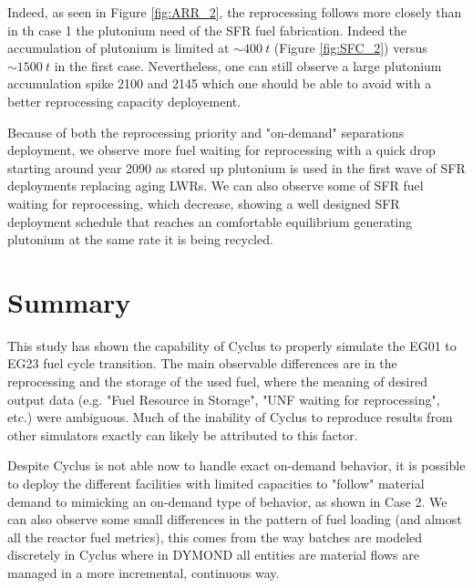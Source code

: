 \documentclass[12pt]{article}
\begin{document}
Indeed, as seen in Figure \ref{fig:ARR_2}, the reprocessing follows more closely
than in th case 1 the plutonium need of the SFR fuel fabrication. Indeed the
accumulation of plutonium is limited at $\sim400~t$ (Figure \ref{fig:SFC_2}) versus $\sim1500~t$ in the
first case. Nevertheless, one can still observe a large plutonium accumulation
spike 2100 and 2145 which one should be able to avoid with a better reprocessing
capacity deployement.

Because of both the reprocessing priority and "on-demand" separations
deployment, we observe more fuel waiting for reprocessing with a quick drop
starting around year 2090 as stored up plutonium is used in the first wave of
SFR deployments replacing aging LWRs. We can also observe some of SFR fuel
waiting for reprocessing, which decrease, showing a well designed SFR
deployment schedule that reaches an comfortable equilibrium generating
plutonium at the same rate it is being recycled.

\section{Summary}

This study has shown the capability of Cyclus to properly simulate the EG01 to
EG23 fuel cycle transition.  The main observable differences are in the
reprocessing and the storage of the used fuel, where the meaning of desired
output data (e.g. "Fuel Resource in Storage", "UNF waiting for reprocessing",
etc.) were ambiguous.  Much of the inability of Cyclus to reproduce results
from other simulators exactly can likely be attributed to this factor.

Despite Cyclus is not able now to handle exact on-demand behavior, it is
possible to deploy the different facilities with limited capacities to
"follow" material demand to mimicking an on-demand type of behavior, as shown
in Case 2.  We can also observe some small differences in the pattern of fuel
loading (and almost all the reactor fuel metrics), this comes from the way
batches are modeled discretely in Cyclus where in DYMOND all entities are
material flows are managed in a more incremental, continuous way.






\end{document}
